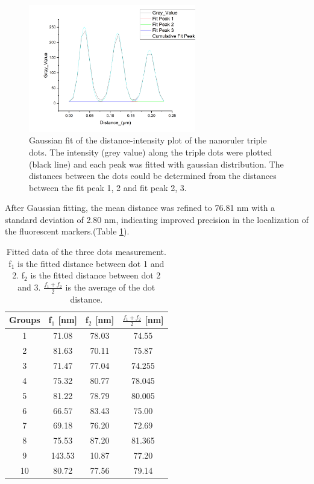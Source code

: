 \documentclass[a4paper,english,12pt,bibliography=totoc]{scrreprt}
\begin{document}
\begin{figure}[H]
    \centering
    \includegraphics[width=0.65\textwidth]{Images/PAINT/Gaussian fitting example.png}
    \caption{Gaussian fit of the distance-intensity plot of the nanoruler triple dots. The intensity (grey value) along the triple dots were plotted (black line) and each peak was fitted with gaussian distribution. The distances between the dots could be determined from the distances between the fit peak 1, 2 and fit peak 2, 3.}
    \label{fig:gaussianfit}
\end{figure}

After Gaussian fitting, the mean distance was refined to 76.81 nm with a standard deviation of 2.80 nm, indicating improved precision in the localization of the fluorescent markers.(Table \ref{tab:fitted_data}).

\begin{table}[H]
    \centering
    \begin{tabular}{c|c|c|c}
    \hline
    Groups    & f$_1$ [nm] & f$_2$ [nm] & $\frac{f_1 +f_2}{2}$ [nm] \\
    \hline
    1    & 71.08&78.03 &74.55\\
    2    & 81.63&70.11 &75.87\\
    3    & 71.47 &77.04 &74.255\\
    4    & 75.32 &80.77&78.045\\
    5    & 81.22&78.79&80.005\\
    6    & 66.57&83.43 &75.00\\
    7    & 69.18&76.20 &72.69\\
    8    & 75.53&87.20 &81.365\\
    9    & 143.53&10.87 &77.20\\
    10   & 80.72 &77.56 &79.14\\
    \hline
    \end{tabular}
    \caption{Fitted data of the three dots measurement. f$_1$ is the fitted distance between dot 1 and 2. f$_2$ is the fitted distance between dot 2 and 3. $\frac{f_1 +f_2}{2}$  is the average of the dot distance.}
    \label{tab:fitted_data}
\end{table}
\end{document}
